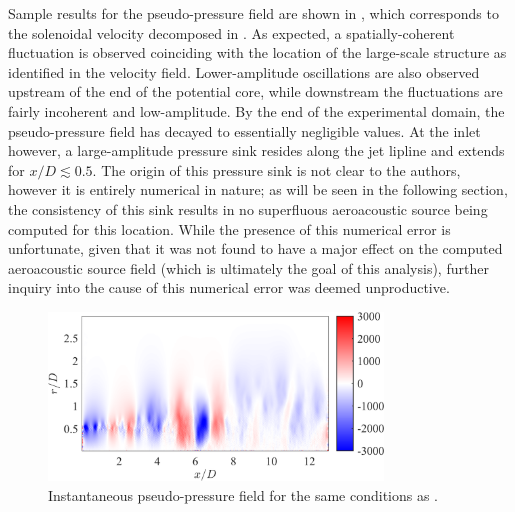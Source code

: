 Sample results for the pseudo-pressure field are shown in , which corresponds to the solenoidal velocity decomposed in .
As expected, a spatially-coherent fluctuation is observed coinciding with the location of the large-scale structure as identified in the velocity field.
Lower-amplitude oscillations are also observed upstream of the end of the potential core, while downstream the fluctuations are fairly incoherent and low-amplitude.
By the end of the experimental domain, the pseudo-pressure field has decayed to essentially negligible values.
At the inlet however, a large-amplitude pressure sink resides along the jet lipline and extends for $x/D \lesssim 0.5$.
The origin of this pressure sink is not clear to the authors, however it is entirely numerical in nature; as will be seen in the following section, the consistency of this sink results in no superfluous aeroacoustic source being computed for this location.
While the presence of this numerical error is unfortunate, given that it was not found to have a major effect on the computed aeroacoustic source field (which is ultimately the goal of this analysis), further inquiry into the cause of this numerical error was deemed unproductive.
\begin{figure}
	\centering
	\includegraphics[width = 3.5in]{Figures/ch5_valid_Inst_ps_v2.png}
	\caption{Instantaneous pseudo-pressure field for the same conditions as .}
	\label{fig:valid_pseudopressure}
\end{figure}

